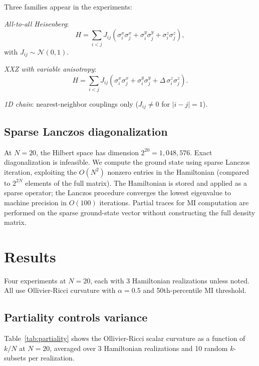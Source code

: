 \documentclass[aps,pra,twocolumn,superscriptaddress,floatfix]{revtex4-2}
\begin{document}
Three families appear in the experiments:

\textit{All-to-all Heisenberg}:
\begin{equation}
H = \sum_{i<j} J_{ij}(\sigma^x_i\sigma^x_j + \sigma^y_i\sigma^y_j + \sigma^z_i\sigma^z_j),
\end{equation}
with $J_{ij} \sim \mathcal{N}(0,1)$.

\textit{XXZ with variable anisotropy}:
\begin{equation}
H = \sum_{i<j} J_{ij}(\sigma^x_i\sigma^x_j + \sigma^y_i\sigma^y_j + \Delta\,\sigma^z_i\sigma^z_j).
\end{equation}

\textit{1D chain}: nearest-neighbor couplings only ($J_{ij} \neq 0$ for $|i-j| = 1$).

\subsection{Sparse Lanczos diagonalization}

At $N = 20$, the Hilbert space has dimension $2^{20} = 1{,}048{,}576$.  Exact diagonalization is infeasible.  We compute the ground state using sparse Lanczos iteration, exploiting the $O(N^2)$ nonzero entries in the Hamiltonian (compared to $2^{2N}$ elements of the full matrix).  The Hamiltonian is stored and applied as a sparse operator; the Lanczos procedure converges the lowest eigenvalue to machine precision in $O(100)$ iterations.  Partial traces for MI computation are performed on the sparse ground-state vector without constructing the full density matrix.


\section{Results}
\label{sec:results}

Four experiments at $N = 20$, each with 3 Hamiltonian realizations unless noted.  All use Ollivier-Ricci curvature with $\alpha = 0.5$ and 50th-percentile MI threshold.

\subsection{Partiality controls variance}

Table~\ref{tab:partiality} shows the Ollivier-Ricci scalar curvature as a function of $k/N$ at $N = 20$, averaged over 3 Hamiltonian realizations and 10 random $k$-subsets per realization.
\end{document}
